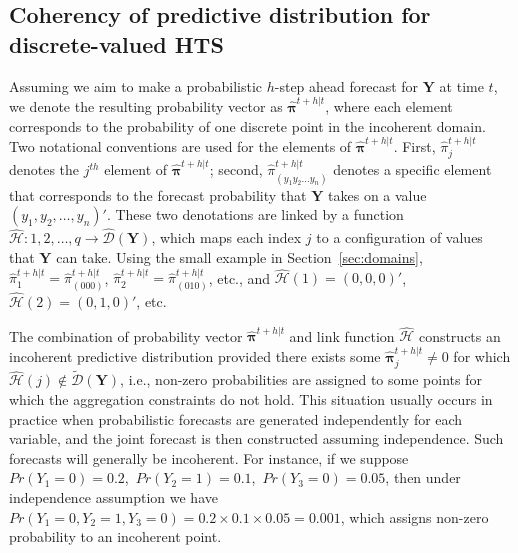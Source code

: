 \documentclass[a4paper,review,12pt,authoryear]{elsarticle}
\newcommand{\bY}{\mathbf{Y}}
\newcommand{\bpi}{\bm{\pi}}
\begin{document}
  \subsection{Coherency of predictive distribution for discrete-valued HTS}

  \label{sec:coherent_df}

  Assuming we aim to make a probabilistic $h$-step ahead forecast for $\bY$ at time $t$, we denote the resulting probability vector as $\hat{\bpi}^{t+h|t}$, where each element corresponds to the probability of one discrete point in the incoherent domain.
  Two notational conventions are used for the elements of $\hat{\bpi}^{t+h|t}$.
  First, $\hat{\pi}_j^{t+h|t}$ denotes the $j^{th}$ element of $\hat{\bpi}^{t+h|t}$;
  second, $\hat{\pi}_{(y_1 y_2 \dots y_n)}^{t+h|t}$ denotes a specific element that corresponds to the forecast probability that $\bY$ takes on a value $(y_1,y_2,\dots,y_n)'$. These two denotations are linked by a function $\hat{\mathcal{H}}:{1,2,\dots,q}\rightarrow\hat{\mathcal{D}}(\bY)$, which maps each index $j$ to a configuration of values that $\bY$ can take.
  Using the small example in Section~\ref{sec:domains}, $\hat{\pi}_1^{t+h|t}=\hat{\pi}_{(000)}^{t+h|t}$, $\hat{\pi}_2^{t+h|t}=\hat{\pi}_{(010)}^{t+h|t}$, etc., and $\hat{\mathcal{H}}(1)=(0,0,0)'$, $\hat{\mathcal{H}}(2)=(0,1,0)'$, etc.

  The combination of probability vector $\hat{\bpi}^{t+h|t}$ and link function $\hat{\mathcal{H}}$ constructs an incoherent predictive distribution provided there exists some $\hat{\bpi}^{t+h|t}_j\neq 0$ for which $\hat{\mathcal{H}}(j)\notin\tilde{\mathcal{D}}(\bY)$, i.e., non-zero probabilities are assigned to some points for which the aggregation constraints do not hold.
  This situation usually occurs in practice when probabilistic forecasts are generated independently for each variable, and the joint forecast is then constructed assuming independence.
  Such forecasts will generally be incoherent.
  For instance, if we suppose $Pr(Y_1=0)=0.2$,~$Pr(Y_2=1)=0.1$,~$Pr(Y_3=0)=0.05$, then under independence assumption we have $Pr(Y_1=0,Y_2=1,Y_3=0)=0.2\times0.1\times0.05=0.001$, which assigns non-zero probability to an incoherent point.
\end{document}
